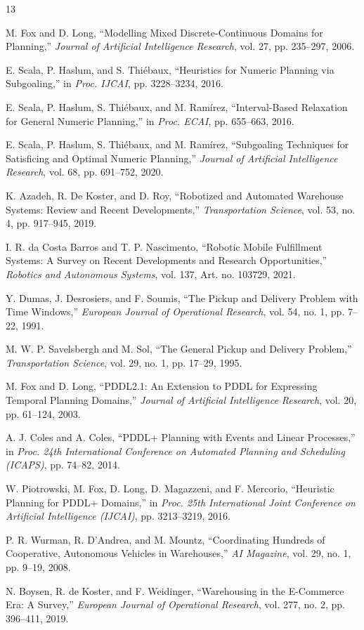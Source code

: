 \documentclass[conference]{IEEEtran}
\begin{document}
\begin{thebibliography}{13}

M. Fox and D. Long,
``Modelling Mixed Discrete-Continuous Domains for Planning,''
\emph{Journal of Artificial Intelligence Research},
vol. 27, pp. 235--297, 2006.

E. Scala, P. Haslum, and S. Thi\'ebaux,
``Heuristics for Numeric Planning via Subgoaling,''
in \emph{Proc. IJCAI}, pp. 3228--3234, 2016.

E. Scala, P. Haslum, S. Thi\'ebaux, and M. Ram\'irez,
``Interval-Based Relaxation for General Numeric Planning,''
in \emph{Proc. ECAI}, pp. 655--663, 2016.

E. Scala, P. Haslum, S. Thi\'ebaux, and M. Ram\'irez,
``Subgoaling Techniques for Satisficing and Optimal Numeric Planning,''
\emph{Journal of Artificial Intelligence Research},
vol. 68, pp. 691--752, 2020.

K. Azadeh, R. De Koster, and D. Roy,
``Robotized and Automated Warehouse Systems: Review and Recent
Developments,''
\emph{Transportation Science},
vol. 53, no. 4, pp. 917--945, 2019.

I. R. da Costa Barros and T. P. Nascimento,
``Robotic Mobile Fulfillment Systems: A Survey on Recent Developments
and Research Opportunities,''
\emph{Robotics and Autonomous Systems},
vol. 137, Art. no. 103729, 2021.

Y. Dumas, J. Desrosiers, and F. Soumis,
``The Pickup and Delivery Problem with Time Windows,''
\emph{European Journal of Operational Research},
vol. 54, no. 1, pp. 7--22, 1991.

M. W. P. Savelsbergh and M. Sol,
``The General Pickup and Delivery Problem,''
\emph{Transportation Science},
vol. 29, no. 1, pp. 17--29, 1995.

M. Fox and D. Long,
``PDDL2.1: An Extension to PDDL for Expressing Temporal Planning Domains,''
\emph{Journal of Artificial Intelligence Research},
vol. 20, pp. 61--124, 2003.

A. J. Coles and A. Coles,
``PDDL+ Planning with Events and Linear Processes,''
in \emph{Proc. 24th International Conference on Automated Planning and
Scheduling (ICAPS)}, pp. 74--82, 2014.

W. Piotrowski, M. Fox, D. Long, D. Magazzeni, and F. Mercorio,
``Heuristic Planning for PDDL+ Domains,''
in \emph{Proc. 25th International Joint Conference on Artificial
Intelligence (IJCAI)}, pp. 3213--3219, 2016.

P. R. Wurman, R. D'Andrea, and M. Mountz,
``Coordinating Hundreds of Cooperative, Autonomous Vehicles in Warehouses,''
\emph{AI Magazine},
vol. 29, no. 1, pp. 9--19, 2008.

N. Boysen, R. de Koster, and F. Weidinger,
``Warehousing in the E-Commerce Era: A Survey,''
\emph{European Journal of Operational Research},
vol. 277, no. 2, pp. 396--411, 2019.

\end{thebibliography}
\end{document}
